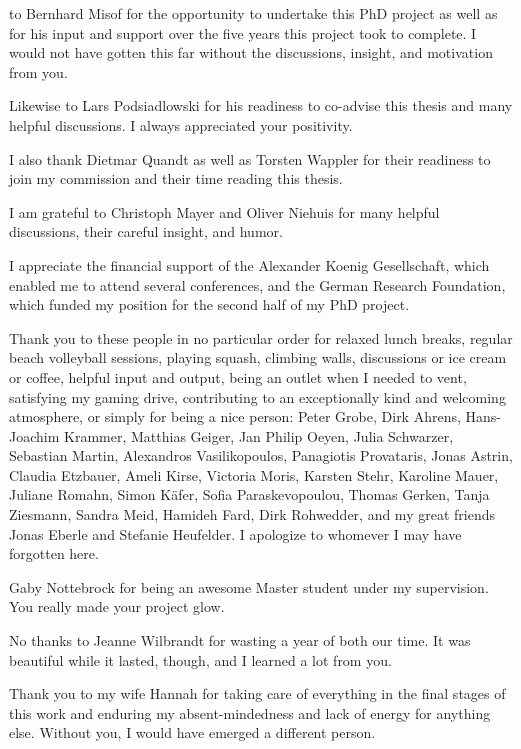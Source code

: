 
 to Bernhard Misof for the opportunity to
undertake this PhD project as well as for his input and support over the
five years this project took to complete.  I would not have gotten this
far without the discussions, insight, and motivation from you.

Likewise to Lars Podsiadlowski for his readiness to co-advise this
thesis and many helpful discussions.  I always appreciated your
positivity.

I also thank Dietmar Quandt as well as Torsten Wappler for their
readiness to join my commission and their time reading this thesis.

I am grateful to Christoph Mayer and Oliver Niehuis for many helpful
discussions, their careful insight, and humor.

I appreciate the financial support of the Alexander Koenig Gesellschaft,
which enabled me to attend several conferences, and the German Research
Foundation, which funded my position for the second half of my PhD
project.

Thank you to these people in no particular order for relaxed lunch
breaks, regular beach volleyball sessions, playing squash, climbing
walls, discussions or ice cream or coffee, helpful input and output,
being an outlet when I needed to vent, satisfying my gaming drive,
contributing to an exceptionally kind and welcoming atmosphere, or
simply for being a nice person:
%
Peter Grobe, Dirk Ahrens, Hans-Joachim Krammer, Matthias Geiger, Jan
Philip Oeyen, Julia Schwarzer, Sebastian Martin, Alexandros
Vasilikopoulos, Panagiotis Provataris, Jonas Astrin, Claudia Etzbauer,
Ameli Kirse, Victoria Moris, Karsten Stehr, Karoline Mauer, Juliane
Romahn, Simon K\"afer, Sofia Paraskevopoulou, Thomas Gerken, Tanja
Ziesmann, Sandra Meid, Hamideh Fard, Dirk Rohwedder, and my great
friends Jonas Eberle and Stefanie Heufelder.  I apologize to whomever I
may have forgotten here.

Gaby Nottebrock for being an awesome Master student under my
supervision.  You really made your project glow.

No thanks to Jeanne Wilbrandt for wasting a year of both our time.  It
was beautiful while it lasted, though, and I learned a lot from you.

Thank you to my wife Hannah for taking care of everything in the final
stages of this work and enduring my absent-mindedness and lack of energy
for anything else.  Without you, I would have emerged a different
person.

